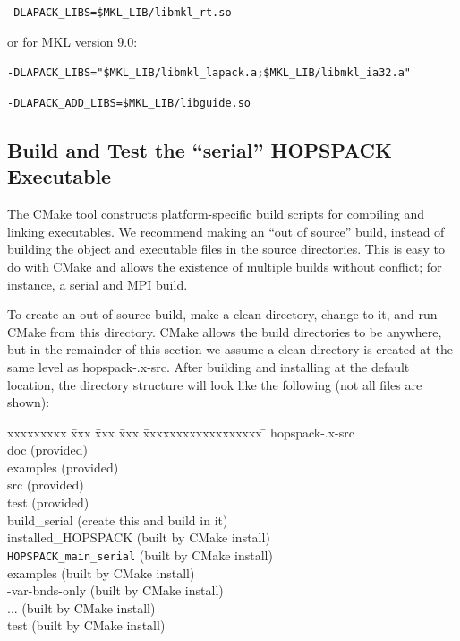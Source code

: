 \hspace{0.2in}
{\tt -DLAPACK\_LIBS=\$MKL\_LIB/libmkl\_rt.so}

\noindent or for MKL version 9.0:

\hspace{0.2in}
{\tt -DLAPACK\_LIBS="\$MKL\_LIB/libmkl\_lapack.a;\$MKL\_LIB/libmkl\_ia32.a"}

\vspace{-11pt}
\hspace{0.2in}
{\tt -DLAPACK\_ADD\_LIBS=\$MKL\_LIB/libguide.so}


\subsection{Build and Test the ``serial'' HOPSPACK Executable}
\label{subinstall:SR}

The CMake tool constructs platform-specific build scripts for compiling and
linking executables.  We recommend making an ``out of source'' build, instead of
building the object and executable files in the source directories.  This is
easy to do with CMake and allows the existence of multiple builds without
conflict; for instance, a serial and MPI build.

To create an out of source build, make a clean directory,
change to it, and run CMake from this directory.  CMake allows the build
directories to be anywhere, but in the remainder of this section we assume a
clean directory is created at the same level as {\sf hopspack-\HOPSVER.x-src}.
After building and installing at the default location,
the directory structure will look like the following (not all files are shown):
\vspace{-11pt}
\begin{tabbing}
  xxxxxxxxx \= xxx \= xxx \= xxx \= xxxxxxxxxxxxxxxxxx \= \kill
  \> {\sf hopspack-\HOPSVER.x-src}  \\
  \> \> {\sf doc}                      \> \> \> (provided)    \\
  \> \> {\sf examples}                 \> \> \> (provided)    \\
  \> \> {\sf src}                      \> \> \> (provided)    \\
  \> \> {\sf test}                     \> \> \> (provided)    \\
  \> {\sf build\_serial}            \> \> \> \> (create this and build in it)  \\
  \> \> {\sf installed\_HOPSPACK}      \> \> \> (built by CMake install)  \\
  \> \> \> {\tt HOPSPACK\_main\_serial}   \> \> (built by CMake install)  \\
  \> \> \> {\sf examples}                 \> \> (built by CMake install)  \\
  \> \> \> \> {-var-bnds-only}          \> (built by CMake install)  \\
  \> \> \> \> {\sf ...}                      \> (built by CMake install)  \\
  \> \> \> {\sf test}                     \> \> (built by CMake install)
\end{tabbing}

